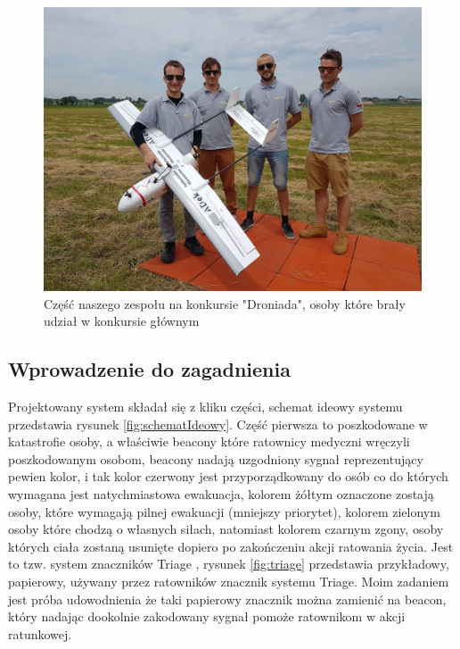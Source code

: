 \begin{figure}[!th]
    \centering
    \includegraphics[width=15cm]{zalaczniki/obrazy/droniada.jpg}
    \caption{Część naszego zespołu na konkursie "Droniada", osoby które brały udział w konkursie głównym}
    \label{fig:zespoldroniada}
\end{figure}

\subsection{Wprowadzenie do zagadnienia}

Projektowany system składał się z kliku części, schemat ideowy systemu przedstawia rysunek \ref{fig:schematIdeowy}. Część pierwsza to poszkodowane w katastrofie osoby, a właściwie beacony które ratownicy medyczni wręczyli poszkodowanym osobom, beacony nadają uzgodniony sygnał reprezentujący pewien kolor, i tak kolor czerwony jest przyporządkowany do osób co do których wymagana jest natychmiastowa ewakuacja, kolorem żółtym oznaczone zostają osoby, które wymagają pilnej ewakuacji (mniejszy priorytet), kolorem zielonym osoby które chodzą o własnych siłach, natomiast kolorem czarnym zgony, osoby których ciała zostaną usunięte dopiero po zakończeniu akcji ratowania życia. Jest to tzw. system znaczników Triage \cite{triage}, rysunek \ref{fig:triage} przedstawia przykładowy, papierowy, używany przez ratowników znacznik systemu Triage. Moim zadaniem jest próba udowodnienia że taki papierowy znacznik można zamienić na beacon, który nadając dookolnie zakodowany sygnał pomoże ratownikom w akcji ratunkowej.


